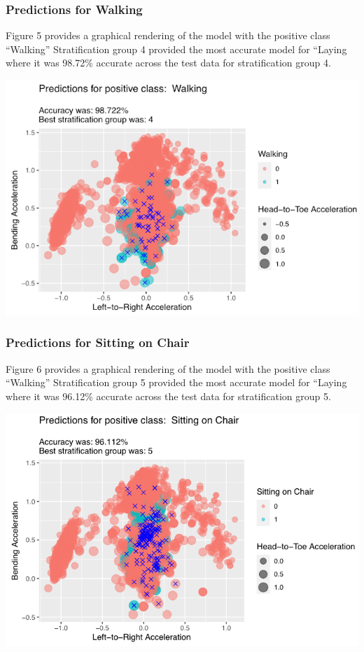 \documentclass[
]{article}
\begin{document}
\subsubsection{Predictions for Walking}\label{predictions-for-walking}

Figure 5 provides a graphical rendering of the model with the positive
class ``Walking'' Stratification group 4 provided the most accurate
model for ``Laying where it was 98.72\% accurate across the test data
for stratification group 4.

\includegraphics[width=0.75\linewidth]{./notebooks/R_Notebooks/images/Walking Predictions}

\subsubsection{Predictions for Sitting on
Chair}\label{predictions-for-sitting-on-chair}

Figure 6 provides a graphical rendering of the model with the positive
class ``Walking'' Stratification group 5 provided the most accurate
model for ``Laying where it was 96.12\% accurate across the test data
for stratification group 5.

\includegraphics[width=0.75\linewidth]{./notebooks/R_Notebooks/images/Sitting on Chair Predictions}
\end{document}
